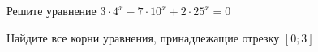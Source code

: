 \begin{ex}
	\begin{condition}
		\begin{enumcols}[label=\asbuk*)]
			\item Решите уравнение \( 3\cdot4^x - 7\cdot 10^x +2\cdot25^x = 0 \)
			\item Найдите все корни уравнения, принадлежащие отрезку \( \left[0;3\right] \)
		\end{enumcols}
	\end{condition}
\end{ex}